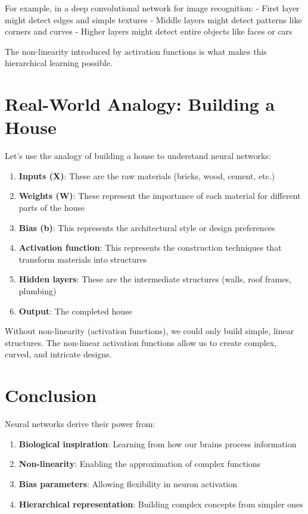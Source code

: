 \documentclass[
  letterpaper,
  DIV=11,
  numbers=noendperiod]{scrreprt}
\providecommand{\tightlist}{%
  \setlength{\itemsep}{0pt}\setlength{\parskip}{0pt}}\usepackage{longtable,booktabs,array}
\begin{document}
For example, in a deep convolutional network for image recognition: -
First layer might detect edges and simple textures - Middle layers might
detect patterns like corners and curves - Higher layers might detect
entire objects like faces or cars

The non-linearity introduced by activation functions is what makes this
hierarchical learning possible.

\section{Real-World Analogy: Building a
House}\label{real-world-analogy-building-a-house}

Let's use the analogy of building a house to understand neural networks:

\begin{enumerate}
\def\labelenumi{\arabic{enumi}.}
\tightlist
\item
  \textbf{Inputs (X)}: These are the raw materials (bricks, wood,
  cement, etc.)
\item
  \textbf{Weights (W)}: These represent the importance of each material
  for different parts of the house
\item
  \textbf{Bias (b)}: This represents the architectural style or design
  preferences
\item
  \textbf{Activation function}: This represents the construction
  techniques that transform materials into structures
\item
  \textbf{Hidden layers}: These are the intermediate structures (walls,
  roof frames, plumbing)
\item
  \textbf{Output}: The completed house
\end{enumerate}

Without non-linearity (activation functions), we could only build
simple, linear structures. The non-linear activation functions allow us
to create complex, curved, and intricate designs.

\section{Conclusion}\label{conclusion-3}

Neural networks derive their power from:

\begin{enumerate}
\def\labelenumi{\arabic{enumi}.}
\tightlist
\item
  \textbf{Biological inspiration}: Learning from how our brains process
  information
\item
  \textbf{Non-linearity}: Enabling the approximation of complex
  functions
\item
  \textbf{Bias parameters}: Allowing flexibility in neuron activation
\item
  \textbf{Hierarchical representation}: Building complex concepts from
  simpler ones
\end{enumerate}
\end{document}
